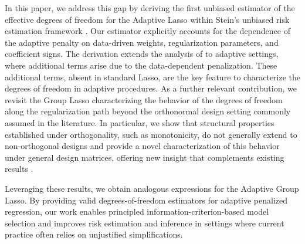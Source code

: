 \documentclass[a4paper, 12pt]{article}
\begin{document}
%
In this paper, we address this gap by deriving the first unbiased estimator of the effective degrees of freedom for the Adaptive Lasso within Stein’s unbiased risk estimation framework \citep{stein1981sure}. Our estimator explicitly accounts for the dependence of the adaptive penalty on data-driven weights, regularization parameters, and coefficient signs. The derivation extends the analysis of \cite{zou2007} to adaptive settings, where additional terms arise due to the data-dependent penalization. These additional terms, absent in standard Lasso, are the key feature to characterize the degrees of freedom in adaptive procedures. %
%
As a further relevant contribution, we revisit the Group Lasso characterizing the behavior of the degrees of freedom along the regularization path beyond the orthonormal design setting commonly assumed in the literature. In particular, we show that structural properties established under orthogonality, such as monotonicity, do not generally extend to non-orthogonal designs and provide a novel characterization of this behavior under general design matrices, offering new insight that complements existing results \citep{yuan:2006:glasso, vaiter_etal.2017}.


Leveraging these results, we obtain analogous expressions for the Adaptive Group Lasso. By providing valid degrees-of-freedom estimators for adaptive penalized regression, our work enables principled information-criterion-based model selection and improves risk estimation and inference in settings where current practice often relies on unjustified simplifications.


\end{document}
